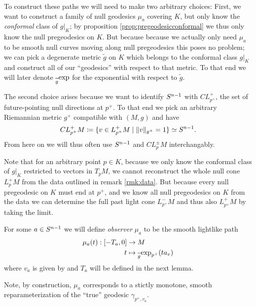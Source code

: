 
\begin{remark}\label{rmk:muconstr}
    To construct these paths we will need to make two arbitrary choices: First, we want to construct a family of null geodesics $\mu_a$ covering $K$, but only know the \emph{conformal} class of $g\rvert_K$; by proposition \ref{prop:pregeodesicconformal} we thus only know the null pregeodesics on $K$. But because because we actually only need $\mu_a$ to be smooth null curves moving along null pregeodesics this poses no problem; we can pick a degenerate metric $\widetilde{g}$ on $K$ which belongs to the conformal class $g\rvert_K$ and construct all of our \enquote{geodesics} with respect to that metric. To that end we will later denote $\prescript{}{\widetilde{g}}{\exp}$ for the exponential with respect to $\widetilde{g}$. 

    The second choice arises because we want to identify ${S^{n-1}}$ with $CL^+_{p^+}$, the set of future-pointing null directions at $p^+$. To that end we pick an arbitrary Riemannian metric $g^+$ compatible with $(M,g)$ and have 
    \begin{align}\label{eq:CLMEQSN}
        CL^+_{p^+}M \coloneqq \{v\in L^+_{p^+}M \mid \lVert v \rVert_{g^+}=1\} \simeq {S^{n-1}}.
    \end{align}
    From here on we will thus often use ${S^{n-1}}$ and $CL^\pm_pM$ interchangably.

    Note that for an arbitrary point $p\in K$, because we only know the conformal class of $g\rvert_{K}$ restricted to vectors in $T_pM$, we cannot reconstruct the whole null cone $L^+_pM$ from the data outlined in remark \ref{rmk:data}.
    But because every null pregeodesic on $K$ must end at $p^+$, and we know all null pregeodesics on $K$ from the data we can determine the full past light cone $L^-_{p^+}M$ and thus also $L^+_{p^+}M$ by taking the limit. 
\end{remark}

\begin{definition}[Observer]
    For some $a\in {S^{n-1}}$ we will define \emph{observer} $\mu_a$ to be the smooth lightlike path
    \begin{align*}
        \mu_a(t):[-T_a,0]&\to M \\
         t&\mapsto\prescript{}{\widetilde{g}}{\exp_{p^+}(ta_v)}    
    \end{align*}
    where $v_a$ is given by  and $T_a$ will be defined in the next lemma.
\end{definition}
Note, by construction, $\mu_a$ corresponds to a stictly monotone, smooth \\reparameterization of the \enquote{true} geodesic $\gamma_{p^+,v_a}$.

